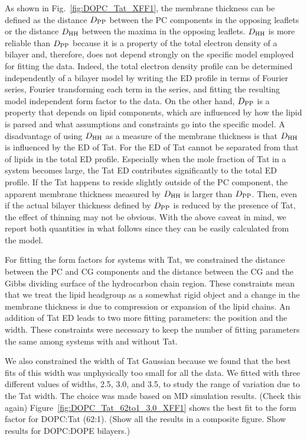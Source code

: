 As shown in Fig.~\ref{fig:DOPC_Tat_XFF1}, the membrane thickness can be defined
as the distance $D_\textrm{PP}$ between the PC components in the opposing leaflets
or the distance $D_\textrm{HH}$ between the maxima in the opposing leaflets. $D_\textrm{HH}$
is more reliable than $D_\textrm{PP}$ because it is a property of the total 
electron density of a bilayer and, therefore, does not depend strongly on the 
specific model employed for fitting the data. Indeed, the total electron
density profile can be determined independently of a bilayer model 
by writing the ED profile in terms of Fourier series, Fourier transforming
each term in the series, and fitting the resulting model independent
form factor to the data. On the other hand, $D_\textrm{PP}$ is a property that
depends on lipid components, which are influenced by how the lipid is parsed 
and what assumptions and constraints go into the specific model.
A disadvantage of using $D_\textrm{HH}$ as a measure of the membrane thickness is
that $D_\textrm{HH}$ is influenced by the ED of Tat. For the ED of Tat cannot be 
separated from that of lipids in the total ED profile. Especially 
when the mole fraction of Tat in a system becomes large, the Tat ED contributes significantly to the total ED profile. If the Tat happens to reside slightly 
outside of the PC component, the apparent membrane thickness measured by $D_\textrm{HH}$
is larger than $D_\textrm{PP}$. Then, even if the actual bilayer thickness defined by $D_\textrm{PP}$ 
is reduced by the presence of Tat, the effect of thinning may not be obvious. 
With the above caveat in mind, we report both quantities in what follows
since they can be easily calculated from the model.

For fitting the form factors for systems with Tat, we constrained the 
distance between the PC and CG components and the distance between the
CG and the Gibbs dividing surface of the hydrocarbon chain region.
These constraints mean that we treat the lipid headgroup as a somewhat
rigid object and a change in the membrane thickness is due to compression
or expansion of the lipid chains. An addition of Tat ED leads to
two more fitting parameters: the position and the width. 
These constraints were necessary to keep the number of fitting parameters 
the same among systems with and without Tat.
 
We also constrained the width of Tat 
Gaussian because we found that the best fits of this width was  
unphysically too small for all the data. 
We fitted with three different values of widths,
2.5, 3.0, and 3.5, to study the range of variation due to the Tat width. 
The choice was made based on MD simulation results. (Check this again)
Figure~\ref{fig:DOPC_Tat_62to1_3.0_XFF1} shows the best fit to the 
form factor for DOPC:Tat (62:1). 
(Show all the results in a composite figure. Show results for DOPC:DOPE bilayers.)

